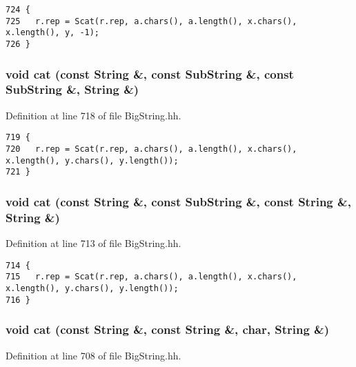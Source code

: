 \footnotesize\begin{verbatim}724 {
725   r.rep = Scat(r.rep, a.chars(), a.length(), x.chars(), x.length(), y, -1);
726 }
\end{verbatim}\normalsize 
{}
\subsubsection{\setlength{\rightskip}{0pt plus 5cm}void cat (const String \&, const {\bf Sub\-String} \&, const {\bf Sub\-String} \&, String \&)\hspace{0.3cm}{\tt  [friend]}}\label{classString_l18}




Definition at line 718 of file Big\-String.hh.



\footnotesize\begin{verbatim}719 {
720   r.rep = Scat(r.rep, a.chars(), a.length(), x.chars(), x.length(), y.chars(), y.length());
721 }
\end{verbatim}\normalsize 
{}
\subsubsection{\setlength{\rightskip}{0pt plus 5cm}void cat (const String \&, const {\bf Sub\-String} \&, const String \&, String \&)\hspace{0.3cm}{\tt  [friend]}}\label{classString_l17}




Definition at line 713 of file Big\-String.hh.



\footnotesize\begin{verbatim}714 {
715   r.rep = Scat(r.rep, a.chars(), a.length(), x.chars(), x.length(), y.chars(), y.length());
716 }
\end{verbatim}\normalsize 
{}
\subsubsection{\setlength{\rightskip}{0pt plus 5cm}void cat (const String \&, const String \&, char, String \&)\hspace{0.3cm}{\tt  [friend]}}\label{classString_l16}




Definition at line 708 of file Big\-String.hh.



